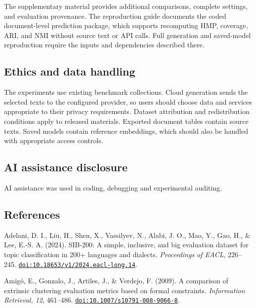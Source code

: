 \documentclass[
  11pt,
  a4paper,
]{article}
\begin{document}
The supplementary material provides additional comparisons, complete
settings, and evaluation provenance. The reproduction guide documents
the coded document-level prediction package, which supports recomputing
HMP, coverage, ARI, and NMI without source text or API calls. Full
generation and saved-model reproduction require the inputs and
dependencies described there.

\subsection{Ethics and data handling}\label{ethics-and-data-handling}

The experiments use existing benchmark collections. Cloud generation
sends the selected texts to the configured provider, so users should
choose data and services appropriate to their privacy requirements.
Dataset attribution and redistribution conditions apply to released
materials. Exported document tables contain source texts. Saved models
contain reference embeddings, which should also be handled with
appropriate access controls.

\subsection{AI assistance disclosure}\label{ai-assistance-disclosure}

AI assistance was used in coding, debugging and experimental auditing.

\clearpage

\subsection{References}\label{references}

\footnotesize{}\setlength{\parskip}{3pt}

Adelani, D. I., Liu, H., Shen, X., Vassilyev, N., Alabi, J. O., Mao, Y.,
Gao, H., \& Lee, E.-S. A. (2024). SIB-200: A simple, inclusive, and big
evaluation dataset for topic classification in 200+ languages and
dialects. \emph{Proceedings of EACL}, 226--245.
\href{https://doi.org/10.18653/v1/2024.eacl-long.14}{\nolinkurl{doi:10.18653/v1/2024.eacl-long.14}}.

Amigó, E., Gonzalo, J., Artiles, J., \& Verdejo, F. (2009). A comparison
of extrinsic clustering evaluation metrics based on formal constraints.
\emph{Information Retrieval, 12}, 461--486.
\href{https://doi.org/10.1007/s10791-008-9066-8}{\nolinkurl{doi:10.1007/s10791-008-9066-8}}.
\end{document}
